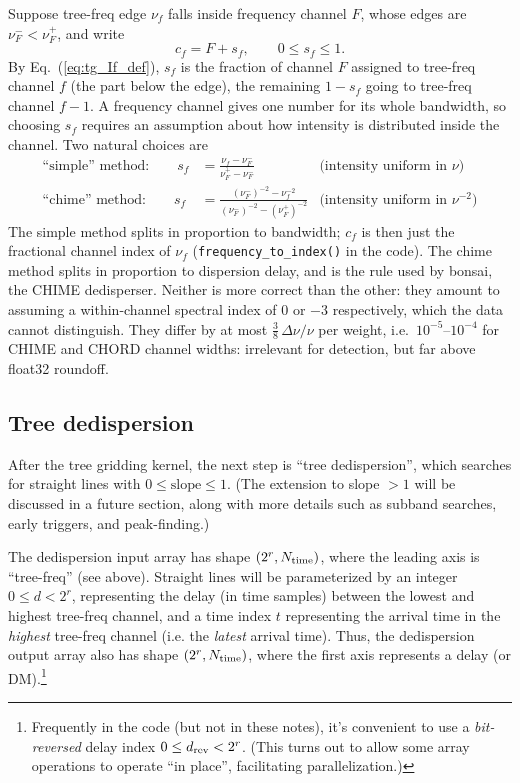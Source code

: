\documentclass{article}
\numberwithin{equation}{section}   %
\begin{document}
Suppose tree-freq edge $\nu_f$ falls inside frequency channel $F$, whose edges are $\nu_F^- < \nu_F^+$, and write
\begin{equation}
c_f = F + s_f, \qquad 0 \le s_f \le 1.
\label{eq:cf_split}
\end{equation}
By Eq.\ (\ref{eq:tg_If_def}), $s_f$ is the fraction of channel $F$ assigned to tree-freq channel $f$ (the part below the edge), the remaining $1 - s_f$ going to tree-freq channel $f-1$.
A frequency channel gives one number for its whole bandwidth, so choosing $s_f$ requires an assumption about how intensity is distributed inside the channel.
Two natural choices are
\begin{align}
\mbox{``simple'' method:} \qquad
  s_f &= \frac{\nu_f - \nu_F^-}{\nu_F^+ - \nu_F^-}
  & \mbox{(intensity uniform in $\nu$)} \label{eq:split_simple} \\
\mbox{``chime'' method:} \qquad
  s_f &= \frac{(\nu_F^-)^{-2} - \nu_f^{-2}}{(\nu_F^-)^{-2} - (\nu_F^+)^{-2}}
  & \mbox{(intensity uniform in $\nu^{-2}$)} \label{eq:split_chime}
\end{align}
The simple method splits in proportion to bandwidth; $c_f$ is then just the fractional channel index of $\nu_f$ ({\tt frequency\_to\_index()} in the code).
The chime method splits in proportion to dispersion delay, and is the rule used by bonsai, the CHIME dedisperser.
Neither is more correct than the other: they amount to assuming a within-channel spectral index of $0$ or $-3$ respectively, which the data cannot distinguish.
They differ by at most $\frac{3}{8}\,\Delta\nu/\nu$ per weight, i.e.\ $10^{-5}$--$10^{-4}$ for CHIME and CHORD channel widths: irrelevant for detection, but far above float32 roundoff.

\subsection{Tree dedispersion}
\label{sec:tree_dedispersion}

After the tree gridding kernel, the next step is ``tree dedispersion'', which searches for straight lines with $0\le \mbox{slope} \le 1$.
(The extension to slope $>1$ will be discussed in a future section, along with more details such as subband searches, early triggers, and peak-finding.)

The dedispersion input array has shape $(2^r, N_{\rm time})$, where the leading axis is ``tree-freq'' (see above).
Straight lines will be parameterized by an integer $0 \le d < 2^r$, representing
the delay (in time samples) between the lowest and highest tree-freq channel,
and a time index $t$ representing the arrival time in the {\em highest} tree-freq channel
(i.e. the {\em latest} arrival time).
Thus, the dedispersion output array also has shape $(2^r, N_{\rm time})$, where the first axis represents a delay (or DM).\footnote{Frequently in the code (but not in these notes), it's convenient to use a {\em bit-reversed} delay index $0 \le d_{\rm rev} < 2^r$. (This turns out to allow some array operations to operate ``in place'', facilitating parallelization.)}
\end{document}
